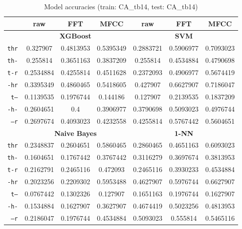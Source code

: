 \documentclass[../main.tex]{subfiles}
\begin{document}
\begin{table}[ht]
	\centering
	\vspace{-0.12cm}
	\caption{Model accuracies (train: CA\_tb14, test: CA\_tb14)}
	\vspace{-0.15cm}
	\label{tab:model_acc_CA_tb14_CA_tb14}
	\begin{small}
	\begin{tabular}{|r|c|c|c|c|c|c|}
		\hline
		 & \textbf{raw} & \textbf{FFT} & \textbf{MFCC} & \textbf{raw} & \textbf{FFT} & \textbf{MFCC} \\
		\hline
		 & \multicolumn{3}{|c|}{\textbf{XGBoost}} & \multicolumn{3}{|c|}{\textbf{SVM}} \\
		\hline
		\texttt{thr} & 0.327907 & 0.4813953 & 0.5395349 & 0.2883721 & 0.5906977 & 0.7093023 \\
		\texttt{th-} & 0.255814 & 0.3651163 & 0.3837209 & 0.255814 & 0.4534884 & 0.4790698 \\
		\texttt{t-r} & 0.2534884 & 0.4255814 & 0.4511628 & 0.2372093 & 0.4906977 & 0.5674419 \\
		\texttt{-hr} & 0.3395349 & 0.4860465 & 0.5418605 & 0.427907 & 0.6627907 & 0.7186047 \\
		\texttt{t--} & 0.1139535 & 0.1976744 & 0.144186 & 0.127907 & 0.2139535 & 0.1837209 \\
		\texttt{-h-} & 0.2604651 & 0.4 & 0.3906977 & 0.3790698 & 0.5093023 & 0.4976744 \\
		\texttt{--r} & 0.2697674 & 0.4093023 & 0.4232558 & 0.4255814 & 0.5767442 & 0.5604651 \\
		\hline
		 & \multicolumn{3}{|c|}{\textbf{Naive Bayes}} & \multicolumn{3}{|c|}{\textbf{1-NN}} \\
		\hline
		\texttt{thr} & 0.2348837 & 0.2604651 & 0.5860465 & 0.2860465 & 0.4651163 & 0.6093023 \\
		\texttt{th-} & 0.1604651 & 0.1767442 & 0.3767442 & 0.3116279 & 0.3697674 & 0.3813953 \\
		\texttt{t-r} & 0.2162791 & 0.2465116 & 0.472093 & 0.2465116 & 0.3930233 & 0.4534884 \\
		\texttt{-hr} & 0.2023256 & 0.2209302 & 0.5953488 & 0.4627907 & 0.5976744 & 0.6627907 \\
		\texttt{t--} & 0.0767442 & 0.1302326 & 0.127907 & 0.1651163 & 0.1976744 & 0.1627907 \\
		\texttt{-h-} & 0.1534884 & 0.1627907 & 0.3627907 & 0.4674419 & 0.5023256 & 0.4813953 \\
		\texttt{--r} & 0.2186047 & 0.1976744 & 0.4534884 & 0.5093023 & 0.555814 & 0.5465116 \\

\end{tabular}
\end{small}
\end{table}
\end{document}
